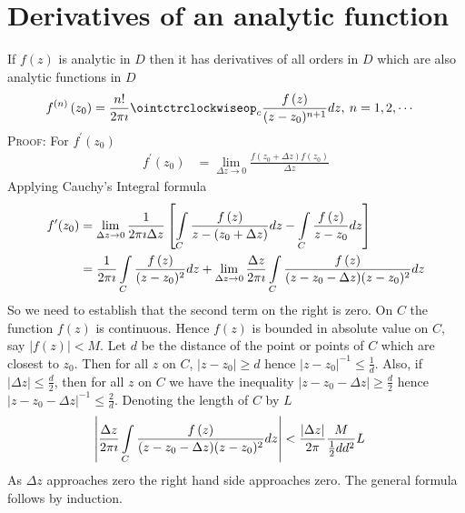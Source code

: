 \documentclass[a4paper,twoside,10pt,english]{report}
\begin{document}
\section{Derivatives of an analytic function}
If $f\left(z\right)$ is analytic in $D$ then it has derivatives of all orders
in $D$ which are also analytic functions in $D$
\begin{align*}
f^{(n)}\left(z_{0}\right) & = \frac{n!}{2\pi\imath}\ointctrclockwiseop_{c}\frac{f\left(z\right)}{(z-z_{0})^{n+1}}dz,\: n=1,2,\cdots
\end{align*}
\textsc{Proof:} 
For $f^{\prime}(z_{0})$
\begin{align*}
f^{\prime}(z_{0}) & = \lim_{\Delta z\rightarrow0}\frac{f\left(z_{0}+\Delta z\right)f\left(z_{0}\right)}{\Delta z}
\end{align*}
Applying Cauchy's Integral formula
\begin{align*}
f^{\prime}(z_{0}) & = \lim_{\Delta z\rightarrow0}\frac{1}{2\pi\imath\Delta z}\left[\intop_{C}\frac{f\left(z\right)}{z-(z_{0}+\Delta z)}dz-\intop_{C}\frac{f\left(z\right)}{z-z_{0}}dz\right]\\
 & = \frac{1}{2\pi\imath}\intop_{C}\frac{f\left(z\right)}{(z-z_{0})^{2}}dz+\lim_{\Delta z\rightarrow0}\frac{\Delta z}{2\pi\imath}\intop_{C}\frac{f\left(z\right)}{(z-z_{0}-\Delta z)(z-z_{0})^{2}}dz
\end{align*}
So we need to establish that the second term on the right is zero.
On $C$ the function $f\left(z\right)$ is continuous. Hence $f\left(z\right)$ is bounded
in absolute value on $C$, say $\left|f\left(z\right)\right|<M$. Let $d$ be
the distance of the point or points of $C$ which are closest to $z_{0}$.
Then for all $z$ on $C$, $\left|z-z_{0}\right|\geq d$ hence $\left|z-z_{0}\right|^{-1}\leq\frac{1}{d}$.
Also, if $\left|\Delta z\right|\leq\frac{d}{2}$, then for all $z$
on $C$ we have the inequality $\left|z-z_{0}-\Delta z\right|\geq\frac{d}{2}$
hence $\left|z-z_{0}-\Delta z\right|^{-1}\leq\frac{2}{d}$. Denoting
the length of $C$ by $L$
\begin{align*}
\left|\frac{\Delta z}{2\pi\imath}\intop_{C}\frac{f\left(z\right)}{(z-z_{0}-\Delta z)(z-z_{0})^{2}}dz\right| & < \frac{\left|\Delta z\right|}{2\pi}\frac{M}{\frac{1}{2}dd^{2}}L
\end{align*}
As $\Delta z$ approaches zero the right hand side approaches zero.
The general formula follows by induction.
\end{document}
